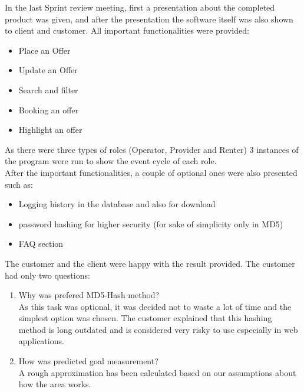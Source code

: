 In the last Sprint review meeting, first a presentation about the completed product was given, and after the presentation the software itself was also shown to client and customer. All important functionalities were provided:
\begin{itemize}
    \item Place an Offer
    \item Update an Offer
    \item Search and filter
    \item Booking an offer
    \item Highlight an offer
\end{itemize}


As there were three types of roles (Operator, Provider and Renter) 3 instances of the program were run to show the event cycle of each role.\\

After the important functionalities, a couple of optional ones were also presented such as:
\begin{itemize}
    \item Logging history in the database and also for download
    \item password hashing for higher security (for sake of simplicity only in MD5)
    \item FAQ section
\end{itemize}


The customer and the client were happy with the result provided. The customer had only two questions:

\begin{enumerate}
    \item Why was prefered MD5-Hash method?\\
    As this task was optional, it was decided not to waste a lot of time and the simplest option was chosen. The customer explained that this hashing method is long outdated and is considered very risky to use especially in web applications.
    \item How was predicted goal measurement?\\
    A rough approximation has been calculated based on our assumptions about how the area works.
\end{enumerate}